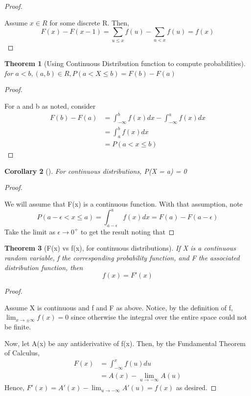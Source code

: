 \documentclass[10pt,]{book}
\theoremstyle{plain}
\newtheorem{theorem}{Theorem}[section]
\newtheorem{corollary}[theorem]{Corollary}
\theoremstyle{definition}
\theoremstyle{definition}
\theoremstyle{definition}
\numberwithin{equation}{section}
\newcommand{\lt}{ < }
\begin{document}
\begin{proof}\hypertarget{proof-24}{}
Assume \(x \in R\) for some discrete R. Then,
		\begin{equation*}F(x) - F(x-1) = \sum_{u \le x} f(u) - \sum_{u \lt x} f(u) = f(x)\end{equation*}
\end{proof}
\begin{theorem}[{Using Continuous Distribution function to compute probabilities}]\label{theorem-Fvsf-continuyous}
for \(a \lt b, (a,b) \in R, P(a \lt X \le b) = F(b) - F(a)\)\end{theorem}
\begin{proof}\hypertarget{proof-25}{}

		For a and b as noted, consider 
		\begin{align*}
F(b) - F(a) & = \int_{-\infty}^b f(x) dx - \int_{-\infty}^a f(x) dx\\
 & = \int_a^b f(x) dx \\
 & = P(a \lt x \le b)
\end{align*}
\end{proof}
\begin{corollary}[{}]\label{corollary-ProbPointZero-continuous}
For continuous distributions, P(X = a) = 0\end{corollary}
\begin{proof}\hypertarget{proof-26}{}

		We will assume that F(x) is a continuous function. With that assumption, note
		\begin{equation*}P(a-\epsilon \lt  x \le a)  = \int_{a-\epsilon}^a f(x) dx = F(a) - F(a-\epsilon)\end{equation*}
		Take the limit as \( \epsilon \rightarrow 0^+\) to get the result noting that
\end{proof}
\begin{theorem}[{F(x) vs f(x), for continuous distributions}]\label{theorem-25}
If X is a continuous random variable, f the corresponding probability function, and F the associated distribution function, then
			\begin{equation*}f(x) = F'(x)\end{equation*}
\end{theorem}
\begin{proof}\hypertarget{proof-27}{}
Assume X is continuous and f and F as above. Notice, by the definition of f, \(\lim_{x \rightarrow \pm \infty} f(x) = 0\) since otherwise the integral over the entire space could not be finite.
\par

	Now, let A(x) be any antiderivative of f(x). Then, by the Fundamental Theorem of Calculus,
	\begin{align*}
F(x) & = \int_{-\infty}^x f(u) du\\
 & = A(x) - \lim_{u \rightarrow -\infty} A(u)
\end{align*}
	Hence, \(F'(x) = A'(x) - \lim_{u \rightarrow -\infty} A'(u) = f(x)\) as desired.
\end{proof}
\typeout{************************************************}
\typeout{************************************************}
\end{document}
